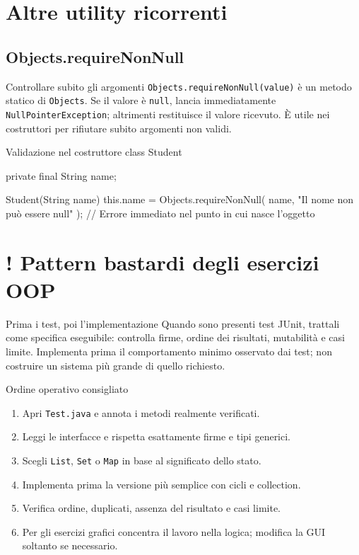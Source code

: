 ﻿\documentclass[10pt,a4paper]{article}
\newcommand{\cmd}[1]{\texttt{#1}}
\DeclareRobustCommand{\exammark}{%
  \texorpdfstring{\textcolor{examred}{\bfseries\Large !}\hspace{.18em}}{! }%
}
\newcommand{\topicsection}[1]{\Needspace{12\baselineskip}\section{#1}}
\newcommand{\topicsubsection}[1]{\Needspace{10\baselineskip}\subsection{#1}}
\newenvironment{topicblock}{%
  \par\medskip\noindent\begin{minipage}{\textwidth}%
}{%
  \end{minipage}\par\medskip%
}
\begin{document}
\begin{topicblock}
\topicsection{Altre utility ricorrenti}
\topicsubsection{Objects.requireNonNull}

\begin{difference}{Controllare subito gli argomenti}
\cmd{Objects.requireNonNull(value)} è un metodo statico di \cmd{Objects}.
Se il valore è \cmd{null}, lancia immediatamente
\cmd{NullPointerException}; altrimenti restituisce il valore ricevuto.
È utile nei costruttori per rifiutare subito argomenti non validi.
\end{difference}

\begin{codebox}{Validazione nel costruttore}
class Student {
    private final String name;

    Student(String name) {
        this.name = Objects.requireNonNull(
            name, "Il nome non può essere null"
        );
        // Errore immediato nel punto in cui nasce l'oggetto
    }
}
\end{codebox}

\end{topicblock}
\topicsection{\exammark Pattern bastardi degli esercizi OOP}

\begin{examtrap}{Prima i test, poi l'implementazione}
Quando sono presenti test JUnit, trattali come specifica eseguibile:
controlla firme, ordine dei risultati, mutabilità e casi limite. Implementa
prima il comportamento minimo osservato dai test; non costruire un sistema
più grande di quello richiesto.
\end{examtrap}

\begin{concept}{Ordine operativo consigliato}
\begin{enumerate}[leftmargin=7mm,itemsep=2pt,topsep=2pt]
\item Apri \cmd{Test.java} e annota i metodi realmente verificati.
\item Leggi le interfacce e rispetta esattamente firme e tipi generici.
\item Scegli \cmd{List}, \cmd{Set} o \cmd{Map} in base al significato dello stato.
\item Implementa prima la versione più semplice con cicli e collection.
\item Verifica ordine, duplicati, assenza del risultato e casi limite.
\item Per gli esercizi grafici concentra il lavoro nella logica; modifica la GUI soltanto se necessario.
\end{enumerate}
\end{concept}
\end{document}
